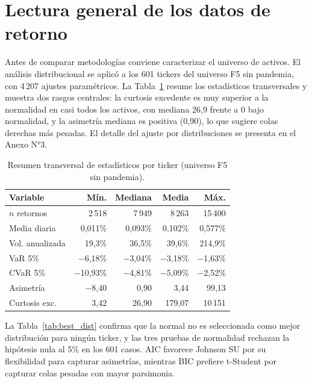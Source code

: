 \section{Lectura general de los datos de retorno}

Antes de comparar metodolog\'ias conviene caracterizar el universo de activos.
El an\'alisis distribucional se aplic\'o a los 601 tickers del universo F5 sin
pandemia, con 4\,207 ajustes param\'etricos. La Tabla~\ref{tab:stats_ticker}
resume los estad\'isticos transversales y muestra dos rasgos centrales: la
curtosis excedente es muy superior a la normalidad en casi todos los activos,
con mediana 26,9 frente a 0 bajo normalidad, y la asimetr\'ia mediana es
positiva (0,90), lo que sugiere colas derechas m\'as pesadas. El detalle del
ajuste por distribuciones se presenta en el Anexo N°3.

\begin{table}[h]
\centering
\caption{Resumen transversal de estad\'isticos por ticker (universo F5 sin
pandemia).}
\label{tab:stats_ticker}
\scriptsize
\begin{tabular}{@{}lrrrr@{}}
\toprule
Variable & M\'in. & Mediana & Media & M\'ax. \\
\midrule
$n$ retornos & 2\,518 & 7\,949 & 8\,263 & 15\,400 \\
Media diaria & 0,011\% & 0,093\% & 0,102\% & 0,577\% \\
Vol. anualizada & 19,3\% & 36,5\% & 39,6\% & 214,9\% \\
VaR 5\% & $-$6,18\% & $-$3,04\% & $-$3,18\% & $-$1,63\% \\
CVaR 5\% & $-$10,93\% & $-$4,81\% & $-$5,09\% & $-$2,52\% \\
Asimetr\'ia & $-$8,40 & 0,90 & 3,44 & 99,13 \\
Curtosis exc. & 3,42 & 26,90 & 179,07 & 10\,151 \\
\bottomrule
\end{tabular}
\end{table}

La Tabla~\ref{tab:best_dist} confirma que la normal no es seleccionada como
mejor distribuci\'on para ning\'un ticker, y las tres pruebas de normalidad
rechazan la hip\'otesis nula al 5\% en los 601 casos. AIC favorece Johnson SU
por su flexibilidad para capturar asimetr\'ias, mientras BIC prefiere t-Student
por capturar colas pesadas con mayor parsimonia.

